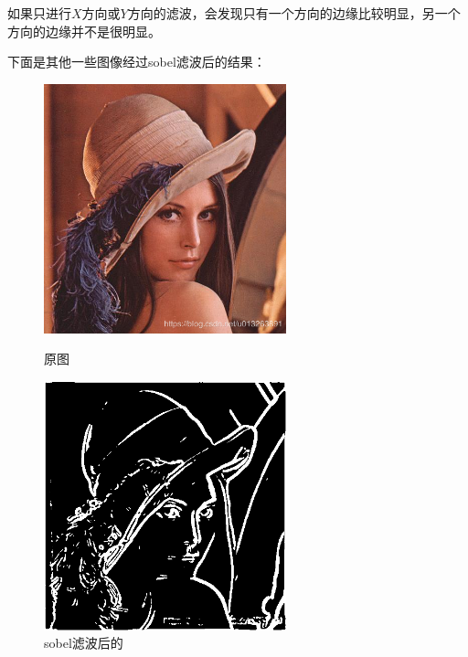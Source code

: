\documentclass[11pt, a4paper, UTF8]{ctexart}
\begin{document}
如果只进行$X$方向或$Y$方向的滤波，会发现只有一个方向的边缘比较明显，另一个方向的边缘并不是很明显。



下面是其他一些图像经过sobel滤波后的结果：


\begin{figure}[H]
  \centering
  \begin{minipage}[t]{0.48\textwidth}
  \centering
  \includegraphics[width=7cm]{lena.png}
  \caption{原图}
  \end{minipage}
  \begin{minipage}[t]{0.48\textwidth}
  \centering
  \includegraphics[width=7cm]{sobel_all_lena.png}
  \caption{sobel滤波后的}
  \end{minipage}
\end{figure}
\end{document}
